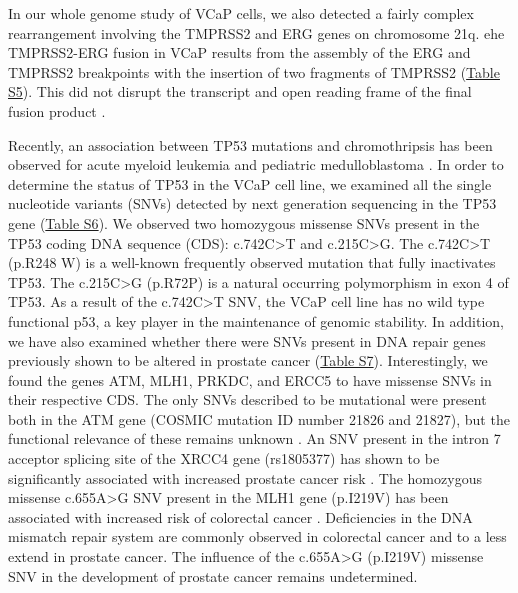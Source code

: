 In our whole genome study of VCaP cells, we also detected a fairly complex rearrangement involving the TMPRSS2 and ERG genes on chromosome 21q.
ehe TMPRSS2-ERG fusion in VCaP results from the assembly of the ERG and TMPRSS2 breakpoints with the insertion of two fragments of TMPRSS2 (\href{https://link.springer.com/article/10.1007/s00439-013-1308-1#SupplementaryMaterial}{Table S5}).
This did not disrupt the transcript and open reading frame of the final fusion product \cite{mertz2007molecular}.

Recently, an association between TP53 mutations and chromothripsis has been observed for acute myeloid leukemia and pediatric
medulloblastoma \cite{rausch2012genome}. In order to determine the status of TP53 in the VCaP cell line, we examined all the single
nucleotide variants (SNVs) detected by next generation sequencing in the TP53 gene (\href{https://link.springer.com/article/10.1007/s00439-013-1308-1#SupplementaryMaterial}{Table S6}). We observed two homozygous missense
SNVs present in the TP53 coding DNA sequence (CDS): c.742C>T and c.215C>G. The c.742C>T (p.R248 W) is a well-known frequently
observed mutation that fully inactivates TP53. The c.215C>G (p.R72P) is a natural occurring polymorphism in exon 4 of TP53.
As a result of the c.742C>T SNV, the VCaP cell line has no wild type functional p53, a key player in the maintenance of genomic
stability. In addition, we have also examined whether there were SNVs present in DNA repair genes previously shown to be altered
in prostate cancer \cite{grasso2012mutational} (\href{https://link.springer.com/article/10.1007/s00439-013-1308-1#SupplementaryMaterial}{Table S7}). Interestingly, we found the genes ATM, MLH1, PRKDC, and ERCC5 to have missense
SNVs in their respective CDS. The only SNVs described to be mutational were present both in the ATM gene (COSMIC mutation ID number
21826 and 21827), but the functional relevance of these remains unknown \cite{gumy2006atm}. An SNV present in the intron 7
acceptor splicing site of the XRCC4 gene (rs1805377) has shown to be significantly associated with increased prostate cancer risk
\cite{mandal2011polymorphisms}. The homozygous missense c.655A>G SNV present in the MLH1 gene (p.I219V) has been associated with increased
risk of colorectal cancer \cite{campbell2009mismatch}. Deficiencies in the DNA mismatch repair system are commonly observed in colorectal
cancer and to a less extend in prostate cancer. The influence of the c.655A>G (p.I219V) missense SNV in the development of prostate
cancer remains undetermined.

